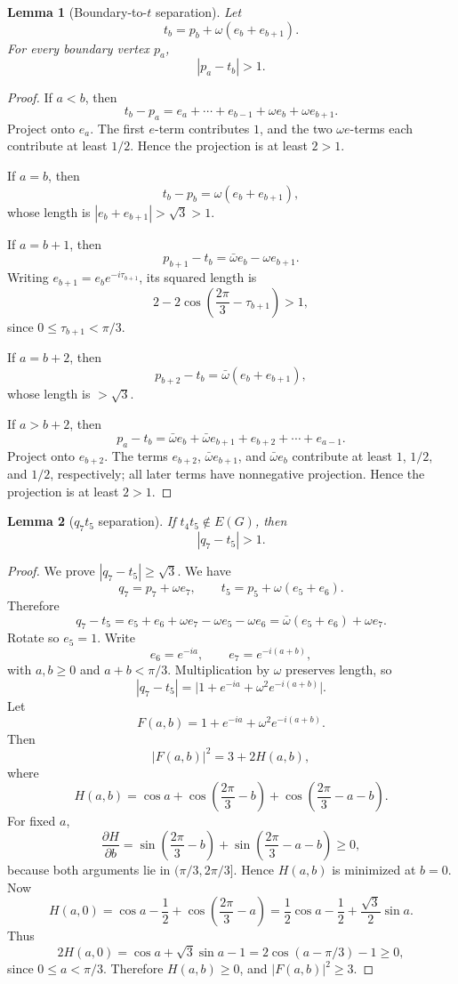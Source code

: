 \documentclass[11pt]{article}
\theoremstyle{plain}
\newtheorem{lemma}{Lemma}
\numberwithin{equation}{section}
\begin{document}
\begin{lemma}[Boundary-to-$t$ separation]\label{lem:bt}
Let
\[
 t_b=p_b+\omega(e_b+e_{b+1}).
\]
For every boundary vertex $p_a$,
\[
 |p_a-t_b|>1.
\]
\end{lemma}

\begin{proof}
If $a<b$, then
\[
 t_b-p_a=e_a+\cdots+e_{b-1}+\omega e_b+\omega e_{b+1}.
\]
Project onto $e_a$. The first $e$-term contributes $1$, and the two $\omega e$-terms each contribute at least $1/2$. Hence the projection is at least $2>1$.

If $a=b$, then
\[
 t_b-p_b=\omega(e_b+e_{b+1}),
\]
whose length is $|e_b+e_{b+1}|>\sqrt3>1$.

If $a=b+1$, then
\[
 p_{b+1}-t_b=\bar\omega e_b-\omega e_{b+1}.
\]
Writing $e_{b+1}=e_be^{-i\tau_{b+1}}$, its squared length is
\[
 2-2\cos\left(\frac{2\pi}{3}-\tau_{b+1}\right)>1,
\]
since $0\le\tau_{b+1}<\pi/3$.

If $a=b+2$, then
\[
 p_{b+2}-t_b=\bar\omega(e_b+e_{b+1}),
\]
whose length is $>\sqrt3$.

If $a>b+2$, then
\[
 p_a-t_b=\bar\omega e_b+\bar\omega e_{b+1}+e_{b+2}+\cdots+e_{a-1}.
\]
Project onto $e_{b+2}$. The terms $e_{b+2}$, $\bar\omega e_{b+1}$, and $\bar\omega e_b$ contribute at least $1$, $1/2$, and $1/2$, respectively; all later terms have nonnegative projection. Hence the projection is at least $2>1$.
\end{proof}

\begin{lemma}[$q_7t_5$ separation]\label{lem:q7t5}
If $t_4t_5\notin E(G)$, then
\[
 |q_7-t_5|>1.
\]
\end{lemma}

\begin{proof}
We prove $|q_7-t_5|\ge\sqrt3$. We have
\[
 q_7=p_7+\omega e_7,
\qquad
 t_5=p_5+\omega(e_5+e_6).
\]
Therefore
\[
 q_7-t_5=e_5+e_6+\omega e_7-\omega e_5-\omega e_6
          =\bar\omega(e_5+e_6)+\omega e_7.
\]
Rotate so $e_5=1$. Write
\[
 e_6=e^{-ia},
 \qquad
 e_7=e^{-i(a+b)},
\]
with $a,b\ge0$ and $a+b<\pi/3$. Multiplication by $\omega$ preserves length, so
\[
 |q_7-t_5|=\bigl|1+e^{-ia}+\omega^2e^{-i(a+b)}\bigr|.
\]
Let
\[
 F(a,b)=1+e^{-ia}+\omega^2e^{-i(a+b)}.
\]
Then
\[
 |F(a,b)|^2=3+2H(a,b),
\]
where
\[
 H(a,b)=\cos a+
 \cos\left(\frac{2\pi}{3}-b\right)+
 \cos\left(\frac{2\pi}{3}-a-b\right).
\]
For fixed $a$,
\[
 \frac{\partial H}{\partial b}=
 \sin\left(\frac{2\pi}{3}-b\right)+
 \sin\left(\frac{2\pi}{3}-a-b\right)\ge0,
\]
because both arguments lie in $(\pi/3,2\pi/3]$. Hence $H(a,b)$ is minimized at $b=0$.
Now
\[
 H(a,0)=\cos a-\frac12+
 \cos\left(\frac{2\pi}{3}-a\right)
 =\frac12\cos a-\frac12+\frac{\sqrt3}{2}\sin a.
\]
Thus
\[
 2H(a,0)=\cos a+\sqrt3\sin a-1
        =2\cos(a-\pi/3)-1\ge0,
\]
since $0\le a<\pi/3$. Therefore $H(a,b)\ge0$, and $|F(a,b)|^2\ge3$.
\end{proof}
\end{document}
